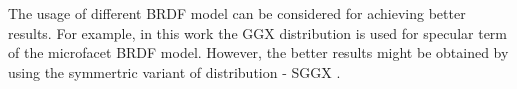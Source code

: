 The usage of different BRDF model can be considered for achieving better results.
For example, in this work the GGX distribution \cite{walter2007microfacet}
is used for specular term of the microfacet BRDF model.
However, the better results might be obtained by using the symmertric variant of distribution - SGGX \cite{heitz2015sggx}.




